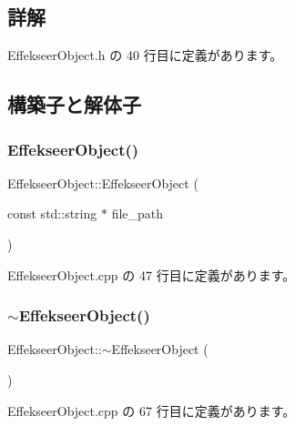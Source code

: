 \subsection{詳解}


 Effekseer\+Object.\+h の 40 行目に定義があります。



\subsection{構築子と解体子}
\mbox{\label{class_effekseer_object_a8e1e081f62efa87b31e00bcfd9cf1a45}} 
\subsubsection{\texorpdfstring{Effekseer\+Object()}{EffekseerObject()}}
{\footnotesize\ttfamily Effekseer\+Object\+::\+Effekseer\+Object (\begin{DoxyParamCaption}\item[{const std\+::string $\ast$}]{file\+\_\+path }\end{DoxyParamCaption})}



 Effekseer\+Object.\+cpp の 47 行目に定義があります。

\mbox{\label{class_effekseer_object_a0463ba508e3c83576991138465847054}} 
\subsubsection{\texorpdfstring{$\sim$\+Effekseer\+Object()}{~EffekseerObject()}}
{\footnotesize\ttfamily Effekseer\+Object\+::$\sim$\+Effekseer\+Object (\begin{DoxyParamCaption}{ }\end{DoxyParamCaption})\hspace{0.3cm}{\ttfamily [virtual]}}



 Effekseer\+Object.\+cpp の 67 行目に定義があります。




